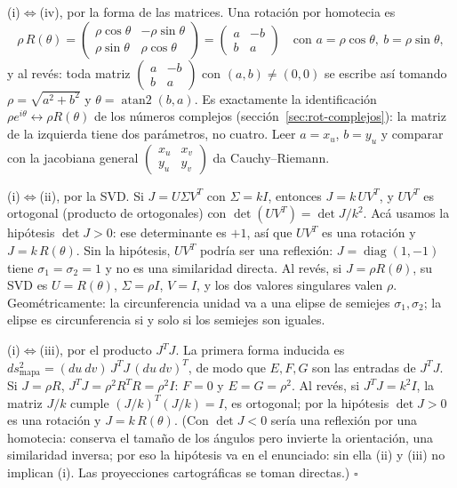 (i)\(\Leftrightarrow\)(iv), por la forma de las matrices. Una rotación por homotecia es
\[
  \rho\,R(\theta)=\begin{pmatrix}\rho\cos\theta&-\rho\sin\theta\\ \rho\sin\theta&\rho\cos\theta\end{pmatrix}
  =\begin{pmatrix}a&-b\\b&a\end{pmatrix}\quad\text{con } a=\rho\cos\theta,\ b=\rho\sin\theta ,
\]
y al revés: toda matriz \(\begin{pmatrix}a&-b\\b&a\end{pmatrix}\) con \((a,b)\neq(0,0)\)
se escribe así tomando \(\rho=\sqrt{a^2+b^2}\) y \(\theta=\operatorname{atan2}(b,a)\). Es
exactamente la identificación \(\rho e^{i\theta}\leftrightarrow\rho R(\theta)\) de los números
complejos (sección~\ref{sec:rot-complejos}): la matriz de la izquierda tiene dos parámetros, no cuatro. Leer \(a=x_u\),
\(b=y_u\) y comparar con la jacobiana general
\(\begin{pmatrix}x_u&x_v\\y_u&y_v\end{pmatrix}\) da Cauchy--Riemann.

(i)\(\Leftrightarrow\)(ii), por la SVD. Si \(J=U\Sigma V^T\) con \(\Sigma=kI\), entonces
\(J=k\,UV^T\), y \(UV^T\) es ortogonal (producto de ortogonales) con
\(\det(UV^T)=\det J/k^2\). Acá usamos la hipótesis \(\det J>0\): ese determinante es
\(+1\), así que \(UV^T\) es una rotación y \(J=k\,R(\theta)\). Sin la hipótesis, \(UV^T\)
podría ser una reflexión: \(J=\operatorname{diag}(1,-1)\) tiene \(\sigma_1=\sigma_2=1\) y no
es una similaridad directa. Al revés, si
\(J=\rho R(\theta)\), su SVD es \(U=R(\theta)\), \(\Sigma=\rho I\), \(V=I\), y los dos
valores singulares valen \(\rho\). Geométricamente: la circunferencia unidad va a una
elipse de semiejes \(\sigma_1,\sigma_2\); la elipse es circunferencia si y solo si los
semiejes son iguales.

(i)\(\Leftrightarrow\)(iii), por el producto \(J^TJ\). La primera forma inducida es
\(ds^2_{\text{mapa}}=(du\ dv)\,J^TJ\,(du\ dv)^T\), de modo que \(E,F,G\) son las
entradas de \(J^TJ\). Si \(J=\rho R\), \(J^TJ=\rho^2R^TR=\rho^2I\): \(F=0\) y
\(E=G=\rho^2\). Al revés, si \(J^TJ=k^2I\), la matriz \(J/k\) cumple \((J/k)^T(J/k)=I\),
es ortogonal; por la hipótesis \(\det J>0\) es una rotación y \(J=k\,R(\theta)\). (Con
\(\det J<0\) sería una reflexión por una homotecia: conserva el tamaño de los ángulos pero
invierte la orientación, una similaridad inversa; por eso la hipótesis va en el enunciado:
sin ella (ii) y (iii) no implican (i). Las proyecciones cartográficas se toman directas.)
\(\square\)

